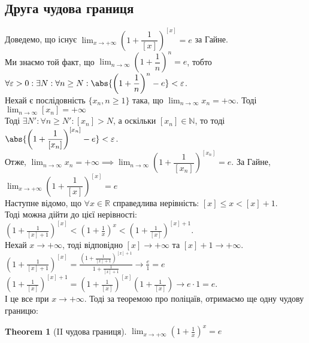 \documentclass[a4paper, 14pt]{article}
\theoremstyle{theoremdd}
\newtheorem{theorem}{Theorem}[subsection]
\theoremstyle{theoremdd}
\theoremstyle{theoremdd}
\theoremstyle{theoremdd}
\theoremstyle{theoremdd}
\theoremstyle{theoremdd}
\theoremstyle{theoremdd}
\theoremstyle{theoremdd}
\begin{document}
\subsection{Друга чудова границя}
Доведемо, що існує $\displaystyle\lim_{x \to +\infty} \left( 1 + \dfrac{1}{[x]} \right)^{[x]} = e$ за Гайне.\\
Ми знаємо той факт, що $\displaystyle\lim_{n \to \infty} \left( 1 + \dfrac{1}{n} \right)^n = e$, тобто 
$\forall \varepsilon > 0: \exists N: \forall n \geq N: \abs{\left( 1 + \dfrac{1}{n} \right)^n - e} < \varepsilon$.\\
Нехай є послідовність $\{x_n, n \geq 1\}$ така, що $\displaystyle\lim_{n \to \infty} x_n = +\infty$. Тоді $\displaystyle\lim_{n \to \infty} [x_n] = +\infty$\\
Тоді $\exists N': \forall n \geq N': [x_n] > N$, а оскільки $[x_n] \in \mathbb{N}$, то тоді $\abs{\left( 1 + \dfrac{1}{[x_n]} \right)^{[x_n]} - e} < \varepsilon$.\\
Отже, $\displaystyle\lim_{n \to \infty} x_n = +\infty \implies \displaystyle\lim_{n \to \infty} \left( 1 + \dfrac{1}{[x_n]} \right)^{[x_n]} = e$. За Гайне, $\displaystyle\lim_{x \to +\infty} \left( 1 + \dfrac{1}{[x]} \right)^{[x]} = e$
\bigskip \\
Наступне відомо, що $\forall x \in \mathbb{R}$ справедлива нерівність: $[x] \leq x < [x]+1$.\\
Тоді можна дійти до цієї нерівності:\\
$\displaystyle \left(1 + \frac{1}{[x]+1} \right)^{[x]} < \left(1 + \frac{1}{x} \right)^x < \left(1 + \frac{1}{[x]} \right)^{[x]+1}$.\\
Нехай $x \to +\infty$, тоді відповідно $[x] \to + \infty$ та $[x]+1 \to + \infty$.\\
$\displaystyle \left(1 + \frac{1}{[x]+1} \right)^{[x]} = \frac{\displaystyle \left(1 + \frac{1}{[x]+1} \right)^{[x]+1}}{\displaystyle 1 + \frac{1}{[x]+1}} \to \frac{e}{1} = e$\\
$\displaystyle \left(1 + \frac{1}{[x]} \right)^{[x]+1} = \left(1 + \frac{1}{[x]} \right)^{[x]} \left(1 + \frac{1}{[x]} \right) \to e \cdot 1 = e$.\\
І це все при $x \to +\infty$. Тоді за теоремою про поліцаїв, отримаємо ще одну чудову границю:
\begin{theorem}[II чудова границя]
$\displaystyle \lim_{x \to +\infty} \left(1 +\frac{1}{x} \right)^x = e$
\end{theorem}
\end{document}
